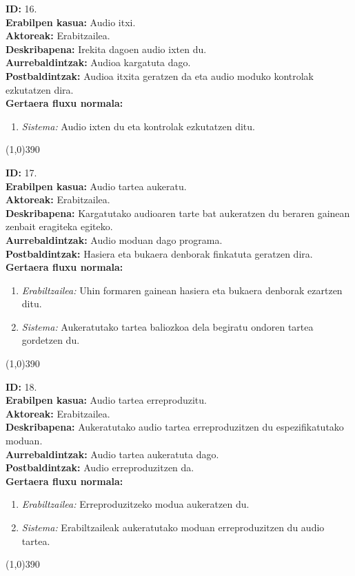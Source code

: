 \noindent
\textbf{ID:} 16.\\
\textbf{Erabilpen kasua:} Audio itxi.\\
\textbf{Aktoreak:} Erabitzailea.\\
\textbf{Deskribapena:} Irekita dagoen audio ixten du.\\
\textbf{Aurrebaldintzak:} Audioa kargatuta dago.\\
\textbf{Postbaldintzak:} Audioa itxita geratzen da eta audio moduko kontrolak ezkutatzen dira.\\
\textbf{Gertaera fluxu normala:}
\begin{enumerate}
	\item \textit{Sistema:} Audio ixten du eta kontrolak ezkutatzen ditu.
\end{enumerate}
\line(1,0){390}

\noindent
\textbf{ID:} 17.\\
\textbf{Erabilpen kasua:} Audio tartea aukeratu.\\
\textbf{Aktoreak:} Erabitzailea.\\
\textbf{Deskribapena:} Kargatutako audioaren tarte bat aukeratzen du beraren gainean zenbait eragiteka egiteko.\\
\textbf{Aurrebaldintzak:} Audio moduan dago programa.\\
\textbf{Postbaldintzak:} Hasiera eta bukaera denborak finkatuta geratzen dira.\\
\textbf{Gertaera fluxu normala:}
\begin{enumerate}
	\item \textit{Erabiltzailea:} Uhin formaren gainean hasiera eta bukaera denborak ezartzen ditu.
	\item \textit{Sistema:} Aukeratutako tartea baliozkoa dela begiratu ondoren tartea gordetzen du.
\end{enumerate}
\line(1,0){390}

\noindent
\textbf{ID:} 18.\\
\textbf{Erabilpen kasua:} Audio tartea erreproduzitu.\\
\textbf{Aktoreak:} Erabitzailea.\\
\textbf{Deskribapena:} Aukeratutako audio tartea erreproduzitzen du espezifikatutako moduan.\\
\textbf{Aurrebaldintzak:} Audio tartea aukeratuta dago.\\
\textbf{Postbaldintzak:} Audio erreproduzitzen da.\\
\textbf{Gertaera fluxu normala:}
\begin{enumerate}
	\item \textit{Erabiltzailea:} Erreproduzitzeko modua aukeratzen du.
	\item \textit{Sistema:} Erabiltzaileak aukeratutako moduan erreproduzitzen du audio tartea.
\end{enumerate}
\line(1,0){390}

